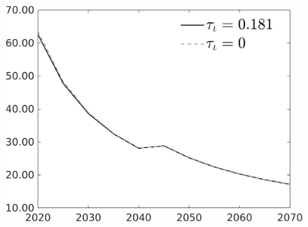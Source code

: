\documentclass[12pt]{article}
\begin{document}
\begin{figure}[h!!]
\begin{minipage}[]{0.32\textwidth}
\end{minipage}	
\begin{minipage}[]{0.32\textwidth}
\includegraphics[width=1\textwidth]{../../codding_model/own_basedOnFried/optimalPol_010922_revision/figures/all_13Sept22/CompTauf_bytaul_Reg0_gAg_spillover0_nsk0_xgr0_knspil0_sep1_LFlimit1_emsbase0_countec0_GovRev0_etaa0.79_lgd1.png}
\end{minipage}	
\end{figure}
\end{document}
